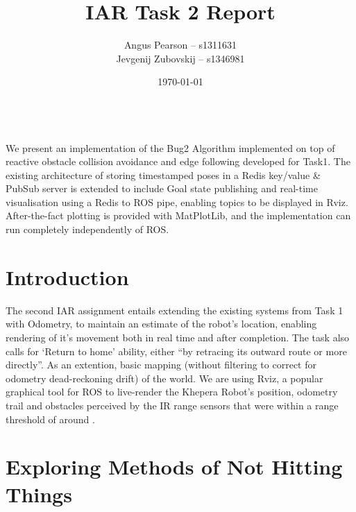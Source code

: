 \documentclass[11pt, a4paper]{article}
\renewenvironment{abstract}{%
{\mdseries\scshape\Large\abstractname}
\vspace{1em}\\
}{\par\noindent}
\begin{document}
\title{IAR Task 2 Report}
\author{Angus Pearson -- s1311631\\ Jevgenij Zubovskij -- s1346981}
\date{\today}
\maketitle



\begin{abstract}
  We present an implementation of the Bug2 \cite{principlesrobot} Algorithm implemented 
  on top  of reactive obstacle collision avoidance and edge following developed for Task1.
  The existing architecture of storing timestamped poses in a Redis \cite{Redis} key/value 
  \& PubSub server is extended to include Goal state publishing and real-time visualisation 
  using a Redis to ROS \cite{ROS} pipe, enabling topics to be displayed in Rviz. 
  After-the-fact plotting is provided with MatPlotLib, and the implementation can run 
  completely independently of ROS.
\end{abstract}



\section{Introduction}

The second IAR assignment entails extending the existing systems from Task 1 with Odometry, 
to maintain an estimate of the robot's location, enabling rendering of it's movement both 
in real time and after completion. The task also calls for `Return to home' ability, either 
``by retracing its outward route or more directly''. As an extention, basic mapping (without
filtering to correct for odometry dead-reckoning drift) of the world. We are using Rviz, a 
popular graphical tool for ROS to live-render the Khepera Robot's position, odometry trail
and obstacles perceived by the IR range sensors that were within a range threshold of around .



\section{Exploring Methods of Not Hitting Things}
\end{document}
